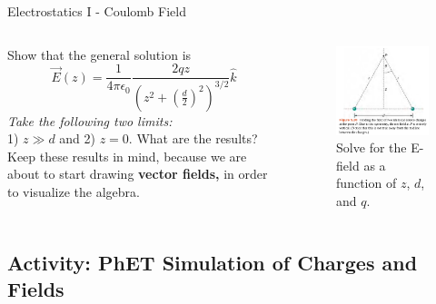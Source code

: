 \documentclass{beamer}
\begin{document}
\begin{frame}{Electrostatics I - Coulomb Field}
\small
\begin{columns}[T]
\begin{column}{0.5\textwidth}
Show that the general solution is
\begin{equation}
\vec{E}(z) = \frac{1}{4\pi\epsilon_0} \frac{2qz}{\left(z^2+\left(\frac{d}{2}\right)^2\right)^{3/2}} \hat{k}
\end{equation}
\textit{Take the following two limits:} \\ 1) $z \gg d$ and 2) $z=0$.  What are the results? \\ \vspace{0.5cm}
Keep these results in mind, because we are about to start drawing \textbf{vector fields,} in order to visualize the algebra.
\end{column}
\begin{column}{0.5\textwidth}
\begin{figure}
\includegraphics[width=\textwidth]{figures/twoChargesZ.png}
\caption{\label{fig:twoChargesZ2} Solve for the E-field as a function of $z$, $d$, and $q$.}
\end{figure}
\end{column}
\end{columns}
\end{frame}

\subsection{Activity: PhET Simulation of Charges and Fields}
\end{document}
